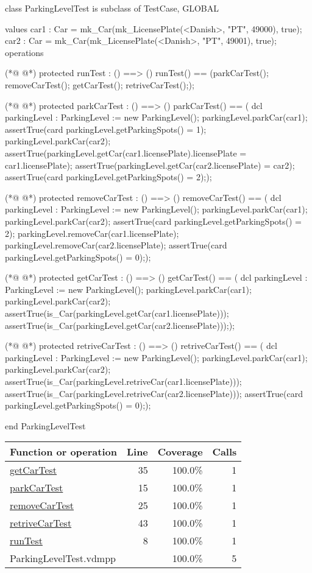 \begin{vdmpp}[breaklines=true]
class ParkingLevelTest is subclass of TestCase, GLOBAL

values
car1 : Car = mk_Car(mk_LicensePlate(<Danish>, "PT", 49000), true); 
car2 : Car = mk_Car(mk_LicensePlate(<Danish>, "PT", 49001), true); 
operations 

(*@
\label{runTest:8}
@*)
protected runTest : () ==> ()
runTest() == 
 (parkCarTest();
  removeCarTest();
  getCarTest();
  retriveCarTest(););
 
(*@
\label{parkCarTest:15}
@*)
protected parkCarTest : () ==> ()
parkCarTest() == (
 dcl parkingLevel : ParkingLevel := new ParkingLevel();
 parkingLevel.parkCar(car1);
 assertTrue(card parkingLevel.getParkingSpots() = 1);
 parkingLevel.parkCar(car2);
 assertTrue(parkingLevel.getCar(car1.licensePlate).licensePlate = car1.licensePlate);
 assertTrue(parkingLevel.getCar(car2.licensePlate) = car2);
 assertTrue(card parkingLevel.getParkingSpots() = 2););

(*@
\label{removeCarTest:25}
@*)
protected removeCarTest : () ==> ()
removeCarTest() == (
 dcl parkingLevel : ParkingLevel := new ParkingLevel();
 parkingLevel.parkCar(car1);
 parkingLevel.parkCar(car2);
 assertTrue(card parkingLevel.getParkingSpots() = 2);
 parkingLevel.removeCar(car1.licensePlate);
 parkingLevel.removeCar(car2.licensePlate); 
 assertTrue(card parkingLevel.getParkingSpots() = 0););

(*@
\label{getCarTest:35}
@*)
protected getCarTest : () ==> ()
getCarTest() == (
 dcl parkingLevel : ParkingLevel := new ParkingLevel();
 parkingLevel.parkCar(car1);
 parkingLevel.parkCar(car2);
 assertTrue(is_Car(parkingLevel.getCar(car1.licensePlate)));
 assertTrue(is_Car(parkingLevel.getCar(car2.licensePlate))););

(*@
\label{retriveCarTest:43}
@*)
protected retriveCarTest : () ==> ()
retriveCarTest() == (
 dcl parkingLevel : ParkingLevel := new ParkingLevel();
 parkingLevel.parkCar(car1);
 parkingLevel.parkCar(car2);
 assertTrue(is_Car(parkingLevel.retriveCar(car1.licensePlate)));
 assertTrue(is_Car(parkingLevel.retriveCar(car2.licensePlate)));
 assertTrue(card parkingLevel.getParkingSpots() = 0););

end ParkingLevelTest
\end{vdmpp}
\bigskip
\begin{longtable}{|l|r|r|r|}
\hline
Function or operation & Line & Coverage & Calls \\
\hline
\hline
\hyperref[getCarTest:35]{getCarTest} & 35&100.0\% & 1 \\
\hline
\hyperref[parkCarTest:15]{parkCarTest} & 15&100.0\% & 1 \\
\hline
\hyperref[removeCarTest:25]{removeCarTest} & 25&100.0\% & 1 \\
\hline
\hyperref[retriveCarTest:43]{retriveCarTest} & 43&100.0\% & 1 \\
\hline
\hyperref[runTest:8]{runTest} & 8&100.0\% & 1 \\
\hline
\hline
ParkingLevelTest.vdmpp & & 100.0\% & 5 \\
\hline
\end{longtable}

